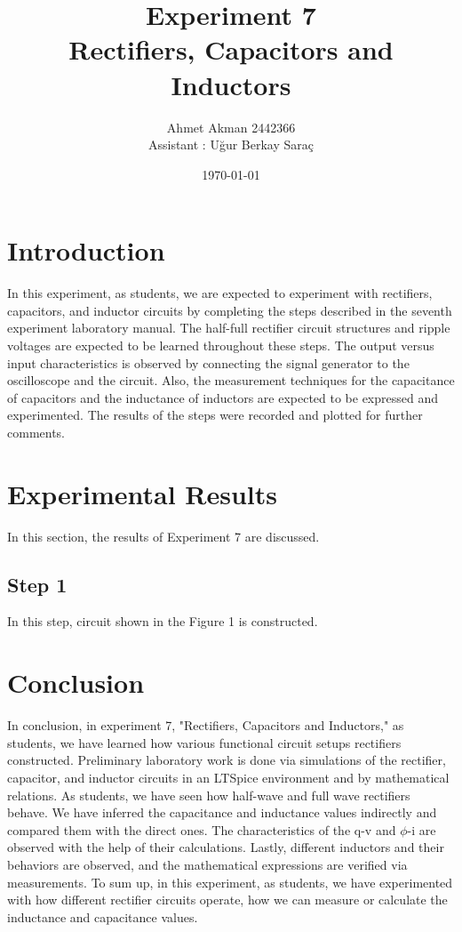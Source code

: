 \documentclass[letterpaper,12pt]{article}
\begin{document}
\title{Experiment 7 \protect\\Rectifiers, Capacitors and Inductors}
\author{Ahmet Akman 2442366 \protect\\ Assistant : Uğur Berkay Saraç}
\date{\today}
\maketitle
\newpage
\tableofcontents
\newpage

\section{Introduction} 
In this experiment, as students, we are expected to experiment with rectifiers, capacitors, and inductor circuits by completing the steps described in the seventh experiment laboratory manual. The half-full rectifier circuit structures and ripple voltages are expected to be learned throughout these steps. The output versus input characteristics is observed by connecting the signal generator to the oscilloscope and the circuit. Also, the measurement techniques for the capacitance of capacitors and the inductance of inductors are expected to be expressed and experimented. The results of the steps were recorded and plotted for further comments.
\section{Experimental Results}
In this section, the results of Experiment 7 are discussed. 
\subsection{Step 1}
In this step, circuit shown in the Figure 1  is constructed. 

\section{Conclusion}

In conclusion, in experiment 7, "Rectifiers, Capacitors and Inductors," as students, we have learned how various functional circuit setups rectifiers constructed. Preliminary laboratory work is done via simulations of the rectifier, capacitor, and inductor circuits in an LTSpice environment and by mathematical relations. As students, we have seen how half-wave and full wave rectifiers behave. We have inferred the capacitance and inductance values indirectly and compared them with the direct ones. The characteristics of the q-v and \(\phi\)-i are observed with the help of their calculations. Lastly, different inductors and their behaviors are observed, and the mathematical expressions are verified via measurements. To sum up, in this experiment, as students, we have experimented with how different rectifier circuits operate, how we can measure or calculate the inductance and capacitance values. 
\end{document}
